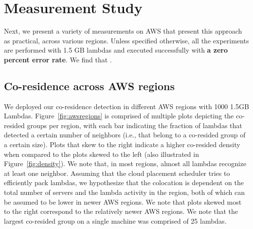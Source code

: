 \section{Measurement Study}
\label{sec:study}

Next, we present a variety of measurements on AWS that present this approach as
practical, across various regions. Unless specified otherwise, all the
experiments are performed with 1.5 GB lambdas and executed successfully with
\textbf{a zero percent error rate}. We find that .


\subsection{Co-residence across AWS regions}
We deployed our co-residence detection in different AWS regions with 1000 1.5GB
Lambdas. Figure~\ref{fig:awsregions} is comprised of multiple plots depicting
the co-resided groups per region, with each bar indicating the fraction of
lambdas that detected a certain number of neighbors (i.e., that belong to a
co-resided group of a certain size). Plots that skew to the right indicate a
higher co-resided density when compared to the plots skewed to the left (also
illustrated in Figure~\ref{fig:density}). We note that, in most regions, almost
all lambdas recognize at least one neighbor.
Assuming that the cloud placement scheduler tries to efficiently 
pack lambdas, we hypothesize that the colocation is dependent on the total number
of servers and the lambda activity in the region, both of which can be assumed
to be lower in newer AWS regions. We note that plots skewed most to the right
correspond to the relatively newer AWS regions.  We note that the largest
co-resided group on a single machine was comprised of 25 lambdas.


